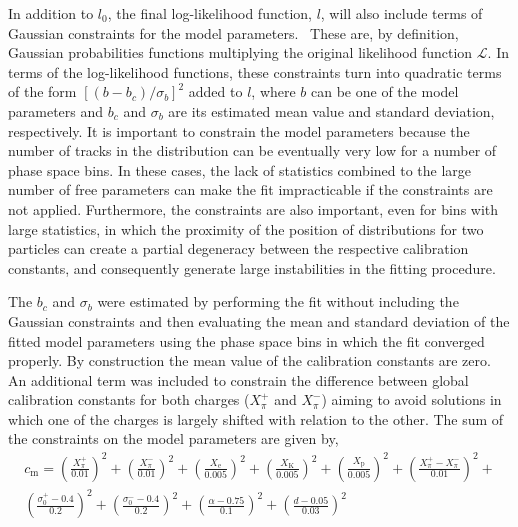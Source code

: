 In addition to $l_0$, the final log-likelihood function, $l$,
will also include terms of Gaussian constraints for the model
parameters.~\cite{Karbach:2012vg} These are, by definition, Gaussian probabilities
functions multiplying the original likelihood function $\mathcal{L}$. 
In terms of the log-likelihood functions, these constraints
turn into quadratic terms of the
form $\left[(b-b_c)/\sigma_b\right]^2$ added to $l$,
where $b$ can be one of the model parameters and 
$b_c$ and $\sigma_b$ are its
estimated mean value and standard deviation, respectively.
It is important to constrain the model parameters because
the number of tracks in the \eps distribution
can be eventually very low for a number of phase space bins.
In these cases, the lack of statistics combined to
the large number of free parameters can make the fit
impracticable if the constraints are not applied.
Furthermore, the constraints are also important,
even for bins with large statistics,
in which the proximity of the position of \eps distributions
for two particles can create a partial degeneracy
between the respective calibration constants,
and consequently
generate large instabilities in the fitting procedure.

The $b_c$ and $\sigma_b$ were
estimated by performing the fit without including
the Gaussian constraints and then evaluating
the mean and standard deviation of the fitted model parameters
using the phase space bins in which the fit converged properly.
By construction the mean value of the calibration constants
are zero. An additional term was included to constrain the
difference between global calibration constants for both
charges ($X_{\pi}^+$ and $X_{\pi}^-$) aiming to avoid solutions
in which one of the charges is largely shifted
with relation to the other.
The sum of the constraints on the model parameters are given by,
\begin{multline}
  c_\text{m} = \left(\frac{X_{\pi}^+}{0.01}\right)^2+\left(\frac{X_{\pi}^-}{0.01}\right)^2+
  \left(\frac{X_\text{e}}{0.005}\right)^2+\left(\frac{X_\text{K}}{0.005}\right)^2+
  \left(\frac{X_\text{p}}{0.005}\right)^2+\left(\frac{X_{\pi}^+-X_{\pi}^-}{0.01}\right)^2+\\
  \left(\frac{\sigma_0^+-0.4}{0.2}\right)^2+\left(\frac{\sigma_0^--0.4}{0.2}\right)^2+
  \left(\frac{\alpha-0.75}{0.1}\right)^2+\left(\frac{d-0.05}{0.03}\right)^2
  \label{eq:hadron:dedx:fit:cm}
\end{multline}

